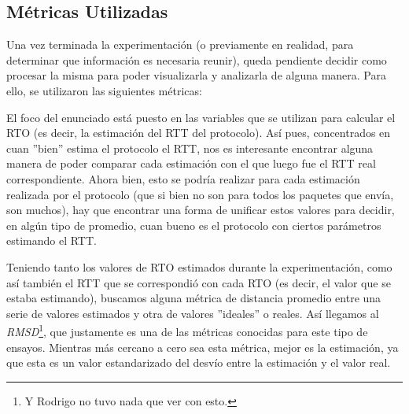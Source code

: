 
\subsection{M\'etricas Utilizadas}\label{sec:variables_metricas:metricas}
\par Una vez terminada la experimentaci\'on (o previamente en realidad, para
determinar que informaci\'on es necesaria reunir), queda pendiente decidir como
procesar la misma para poder visualizarla y analizarla de alguna manera. Para
ello, se utilizaron las siguientes m\'etricas: 

\begin{description}
    \bigskip
    \item[\textbf{Root Mean Square Deviation:}] El foco del enunciado est\'a
        puesto en las variables que se utilizan para calcular el RTO (es decir,
        la estimaci\'on del RTT del protocolo). As\'i pues, concentrados en cuan
        ''bien'' estima el protocolo el RTT, nos es interesante encontrar alguna
        manera de poder comparar cada estimaci\'on con el que luego fue el RTT
        real correspondiente. Ahora bien, esto se podr\'ia realizar para cada
        estimaci\'on realizada por el protocolo (que si bien no son para todos
        los paquetes que env\'ia, son muchos), hay que encontrar una forma de
        unificar estos valores para decidir, en alg\'un tipo de promedio, cuan
        bueno es el protocolo con ciertos par\'ametros estimando el RTT.

        \par Teniendo tanto los valores de RTO estimados durante la
        experimentaci\'on, como as\'i tambi\'en el RTT que se correspondi\'o con
        cada RTO (es decir, el valor que se estaba estimando), buscamos alguna
        m\'etrica de distancia promedio entre una serie de valores estimados y
        otra de valores ''ideales'' o reales. As\'i llegamos al
        \emph{RMSD}\footnote{Y Rodrigo no tuvo nada que ver con
        esto.}\cite{rmsd}, que justamente es una de las m\'etricas conocidas
        para este tipo de ensayos. Mientras m\'as cercano a cero sea esta
        m\'etrica, mejor es la estimaci\'on, ya que esta es un valor
        estandarizado del desv\'io entre la estimaci\'on y el valor real.


\end{description}

